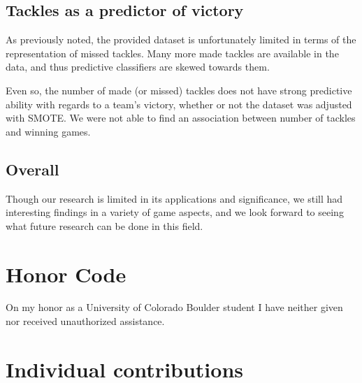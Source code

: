 \documentclass[bibtex, sigconf, hyperref={colorlinks=true,linkcolor=blue,urlcolor=blue}]{acmart}
\begin{document}
\subsection{Tackles as a predictor of victory}

As previously noted, the provided dataset is unfortunately limited in terms of the representation of
missed tackles. Many more made tackles are available in the data, and thus predictive classifiers are
skewed towards them.

Even so, the number of made (or missed) tackles does not have strong predictive ability with regards to
a team's victory, whether or not the dataset was adjusted with SMOTE. We were not able to find an
association between number of tackles and winning games.

\subsection{Overall}

Though our research is limited in its applications and significance, we still had interesting findings
in a variety of game aspects, and we look forward to seeing what future research can be done in
this field.



\nocite{*}

\appendix

\section{Honor Code}

On my honor as a University of Colorado Boulder student I have neither given nor
received unauthorized assistance.

\section{Individual contributions}
\end{document}
